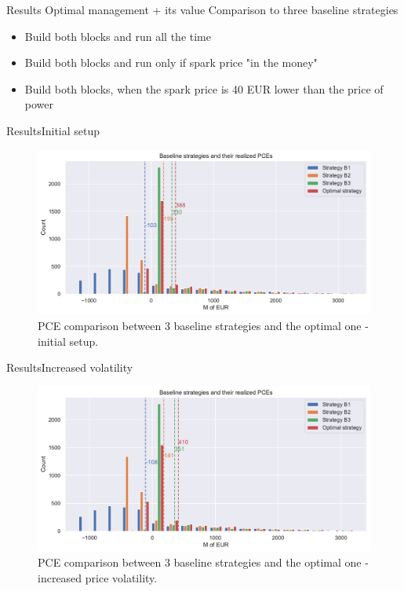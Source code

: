 \documentclass[us]{beamer}
\begin{document}
	\begin{frame}{Results}
		Optimal management + its value
		Comparison to three baseline strategies
		\begin{itemize}
			\item{Build both blocks and run all the time}
			\item{Build both blocks and run only if spark price "in the money"}
			\item{Build both blocks, when the spark price is 40 EUR lower than the price of power}
		\end{itemize}
	\end{frame}


	\begin{frame}{Results}{Initial setup}
	\begin{figure}
		\includegraphics[scale=0.5]{figures/MT_results_1.pdf}
		\caption{PCE comparison between 3 baseline strategies and the optimal one - initial setup.}
	\end{figure}
	\end{frame}

	\begin{frame}{Results}{Increased volatility}
	\begin{figure}
		\includegraphics[scale=0.5]{figures/MT_results_2.pdf}
		\caption{PCE comparison between 3 baseline strategies and the optimal one - increased price volatility.}
	\end{figure}
	\end{frame}
\end{document}
